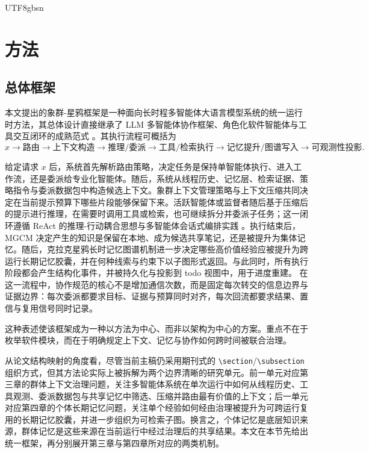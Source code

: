 \documentclass[a4paper,fleqn]{cas-sc}
\begin{document}
\begin{CJK*}{UTF8}{gbsn}
\section{方法}

\subsection{总体框架}

本文提出的象群-星鸦框架是一种面向长时程多智能体大语言模型系统的统一运行时方法，其总体设计直接继承了 LLM 多智能体协作框架、角色化软件智能体与工具交互闭环的成熟范式 \citep{guo2024llmmas,li2024masworkflow,hong2024metagpt,qian2024chatdev,wu2023autogen}。其执行流程可概括为
\begin{equation}
x \rightarrow \text{路由} \rightarrow \text{上下文构造} \rightarrow \text{推理/委派} \rightarrow \text{工具/检索执行} \rightarrow \text{记忆提升/图谱写入} \rightarrow \text{可观测性投影}.
\end{equation}

给定请求 $x$ 后，系统首先解析路由策略，决定任务是保持单智能体执行、进入工作流，还是委派给专业化智能体。随后，系统从线程历史、记忆层、检索证据、策略指令与委派数据包中构造候选上下文。象群上下文管理策略与上下文压缩共同决定在当前提示预算下哪些片段能够保留下来。活跃智能体或监督者随后基于压缩后的提示进行推理，在需要时调用工具或检索，也可继续拆分并委派子任务；这一闭环遵循 ReAct 的推理-行动耦合思想与多智能体会话式编排实践 \citep{yao2023react,wu2023autogen}。执行结束后，MGCM 决定产生的知识是保留在本地、成为候选共享笔记，还是被提升为集体记忆。随后，克拉克星鸦长时记忆图谱机制进一步决定哪些高价值经验应被提升为跨运行长期记忆胶囊，并在何种线索与约束下以子图形式返回。与此同时，所有执行阶段都会产生结构化事件，并被持久化与投影到 todo 视图中，用于进度重建。
在这一流程中，协作规范的核心不是增加通信次数，而是固定每次转交的信息边界与证据边界：每次委派都要求目标、证据与预算同时对齐，每次回流都要求结果、置信与复用信号同时记录。

这种表述使该框架成为一种以方法为中心、而非以架构为中心的方案。重点不在于枚举软件模块，而在于明确规定上下文、记忆与协作如何跨时间被联合治理。

从论文结构映射的角度看，尽管当前主稿仍采用期刊式的 \verb|\section|/\verb|\subsection| 组织方式，但其方法论实际上被拆解为两个边界清晰的研究单元。前一单元对应第三章的群体上下文治理问题，关注多智能体系统在单次运行中如何从线程历史、工具观测、委派数据包与共享记忆中筛选、压缩并路由最有价值的上下文；后一单元对应第四章的个体长期记忆问题，关注单个经验如何经由治理被提升为可跨运行复用的长期记忆胶囊，并进一步组织为可检索子图。换言之，个体记忆是底层知识来源，群体记忆是这些来源在当前运行中经过治理后的共享结果。本文在本节先给出统一框架，再分别展开第三章与第四章所对应的两类机制。


\end{CJK*}
\end{document}
